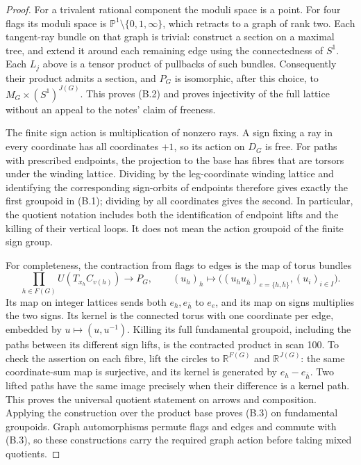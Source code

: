 \begin{proof}
For a trivalent rational component the moduli space is a point.  For
four flags its moduli space is $\mathbb P^1\setminus\{0,1,\infty\}$,
which retracts to a graph of rank two.  Each tangent-ray bundle on
that graph is trivial: construct a section on a maximal tree, and
extend it around each remaining edge using the connectedness of
$S^1$.  Each $L_j$ above is a tensor product of pullbacks of such
bundles.  Consequently their product admits a section, and $P_G$ is
isomorphic, after this choice, to
$M_G\times(S^1)^{J(G)}$.  This proves (B.2) and proves injectivity of
the full lattice without an appeal to the notes' claim of freeness.

The finite sign action is multiplication of nonzero rays.  A sign
fixing a ray in every coordinate has all coordinates $+1$, so its
action on $D_G$ is free.  For paths with prescribed endpoints, the
projection to the base has fibres that are torsors under the winding
lattice.  Dividing by the leg-coordinate winding lattice and
identifying the corresponding sign-orbits of endpoints therefore
gives exactly the first groupoid in (B.1); dividing by all coordinates
gives the second.  In particular, the quotient notation includes
both the identification of endpoint lifts and the killing of their
vertical loops.  It does not mean the action groupoid of the finite
sign group.

For completeness, the contraction from flags to edges is the map of
torus bundles
\[
 \prod_{h\in F(G)}U(T_{x_h}C_{v(h)})\longrightarrow P_G,
 \qquad (u_h)_h\longmapsto
 \bigl((u_hu_{\bar h})_{e=\{h,\bar h\}},(u_i)_{i\in I}\bigr).
 \tag{B.3}
\]
Its map on integer lattices sends both $e_h,e_{\bar h}$ to $e_e$,
and its map on signs multiplies the two signs.  Its kernel is the
connected torus with one coordinate per edge, embedded by
$u\mapsto(u,u^{-1})$.  Killing its full fundamental groupoid,
including the paths between its different sign lifts, is the
contracted product in scan 100.  To check the assertion on each
fibre, lift the circles to $\mathbb R^{F(G)}$ and
$\mathbb R^{J(G)}$: the same coordinate-sum map is surjective, and
its kernel is generated by $e_h-e_{\bar h}$.  Two lifted paths have
the same image precisely when their difference is a kernel path.
This proves the universal quotient statement on arrows and
composition.  Applying the construction over the product base
proves (B.3) on fundamental groupoids.  Graph automorphisms permute
flags and edges and commute with (B.3), so these constructions carry
the required graph action before taking mixed quotients.
\end{proof}

